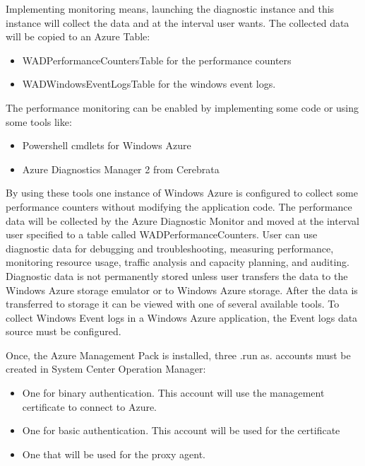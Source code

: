 \documentclass{sig-alternate-05-2015}
\begin{document}
Implementing monitoring means, launching the diagnostic instance and this instance will collect the data and at the interval user wants. The collected data will be copied to an Azure Table:

\begin{itemize}
\item WADPerformanceCountersTable for the performance counters
\item WADWindowsEventLogsTable for the windows event logs.
\end{itemize}

The performance monitoring can be enabled by implementing some code or using some tools like:

\begin{itemize}
  \item Powershell cmdlets for Windows Azure~\cite{cmdlets}
  \item Azure Diagnostics Manager 2 from Cerebrata~\cite{cerebrata}
\end{itemize}

By using these tools one instance of Windows Azure is configured to collect some performance counters without modifying the application code. The performance data will be collected by the Azure Diagnostic Monitor and moved at the interval user specified to a table called WADPerformanceCounters. User can use diagnostic data for debugging and troubleshooting, measuring performance, monitoring resource usage, traffic analysis and capacity planning, and auditing. Diagnostic data is not permanently stored unless user transfers the data to the Windows Azure storage emulator or to Windows Azure storage. After the data is transferred to storage it can be viewed with one of several available tools. To collect Windows Event logs in a Windows Azure application, the Event logs data source must be configured.

Once, the Azure Management Pack is installed, three .run as. accounts must be created in System Center Operation Manager:

\begin{itemize}
 \item One for binary authentication. This account will use the management certificate to connect to Azure.
 \item One for basic authentication. This account will be used for the certificate
 \item One that will be used for the proxy agent.
\end{itemize}
 
\end{document}
